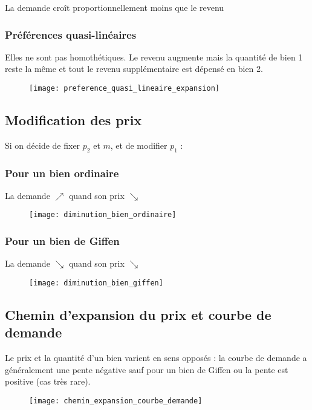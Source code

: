 La demande croît proportionnellement moins que le revenu

\subsubsection{Préférences quasi-linéaires}

Elles ne sont pas homothétiques. Le revenu augmente mais la quantité de bien 1 reste la même et tout le revenu supplémentaire est dépensé en bien 2.

\begin{figure}[H]
	\centering
	\texttt{[image: preference\_quasi\_lineaire\_expansion]}
\end{figure}

\subsection{Modification des prix}

Si on décide de fixer $p_2$ et $m$, et de modifier $p_1$ :

\subsubsection{Pour un bien ordinaire}

La demande $\nearrow$ quand son prix $\searrow$
\begin{figure}[H]
	\centering
	\texttt{[image: diminution\_bien\_ordinaire]}
\end{figure}


\subsubsection{Pour un bien de Giffen}

La demande $\searrow$ quand son prix $\searrow$
\begin{figure}[H]
	\centering
	\texttt{[image: diminution\_bien\_giffen]}
\end{figure}

\subsection{Chemin d'expansion du prix et courbe de demande}

Le prix et la quantité d'un bien varient en sens opposés : la courbe de demande a généralement une pente négative sauf pour un bien de Giffen ou la pente est positive (cas très rare).
\begin{figure}[H]
	\centering
	\texttt{[image: chemin\_expansion\_courbe\_demande]}
\end{figure}

